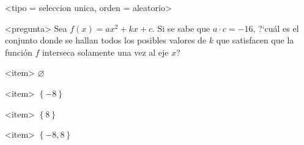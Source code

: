 <tipo = seleccion unica, orden = aleatorio>

<pregunta>
Sea $f(x)=ax^2+kx+c$. Si se sabe que $a\cdot c=-16$, ?`cu\'al es el conjunto donde se hallan todos los posibles valores de $k$ que satisfacen que la funci\'on $f$ interseca solamente una vez al eje $x$?


<item>
$\varnothing$

<item>
$\left\{-8\right\}$

<item>
$\left\{8\right\}$

<item>
$\left\{-8,8\right\}$



